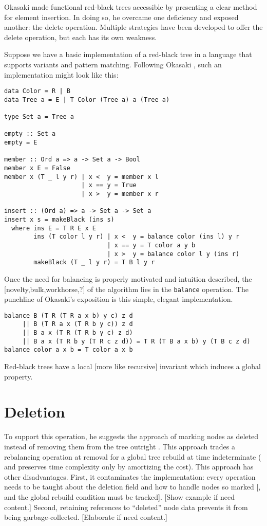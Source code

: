 \documentclass[preprint]{sigplanconf}
\begin{document}
Okasaki \cite{okasaki1999functional} made functional red-black trees accessible by presenting a clear method for element insertion. In doing so, he overcame one deficiency and exposed another: the delete operation. Multiple strategies have been developed to offer the delete operation, but each has its own weakness.

Suppose we have a basic implementation of a red-black tree in a language that supports variants and pattern matching. Following Okasaki \cite{okasaki1999functional}, such an implementation might look like this:

\begin{verbatim}
data Color = R | B
data Tree a = E | T Color (Tree a) a (Tree a)

type Set a = Tree a

empty :: Set a
empty = E

member :: Ord a => a -> Set a -> Bool
member x E = False
member x (T _ l y r) | x <  y = member x l
                     | x == y = True
                     | x >  y = member x r 

insert :: (Ord a) => a -> Set a -> Set a
insert x s = makeBlack (ins s)
  where ins E = T R E x E
        ins (T color l y r) | x <  y = balance color (ins l) y r
                            | x == y = T color a y b
                            | x >  y = balance color l y (ins r)
        makeBlack (T _ l y r) = T B l y r
\end{verbatim}
Once the need for balancing is properly motivated and intuition described, the [novelty,bulk,workhorse,?] of the algorithm lies in the \texttt{balance} operation. The punchline of Okasaki's exposition is this simple, elegant implementation.
\begin{verbatim}
balance B (T R (T R a x b) y c) z d
     || B (T R a x (T R b y c)) z d
     || B a x (T R (T R b y c) z d)
     || B a x (T R b y (T R c z d)) = T R (T B a x b) y (T B c z d)
balance color a x b = T color a x b
\end{verbatim}

Red-black trees have a local [more like recursive] invariant which induces a global property.

\section{Deletion}

To support this operation, he suggests the approach of marking nodes as deleted instead of removing them from the tree outright \cite[p. 50]{okasaki1996purely}. This approach trades a rebalancing operation at removal for a global tree rebuild at time indeterminate ( and preserves time complexity only by amortizing the cost). This approach has other disadvantages. First, it contaminates the implementation: every operation needs to be taught about the deletion field and how to handle nodes so marked [, and the global rebuild condition must be tracked]. [Show example if need content.] Second, retaining references to ``deleted'' node data prevents it from being garbage-collected. [Elaborate if need content.]
\end{document}
